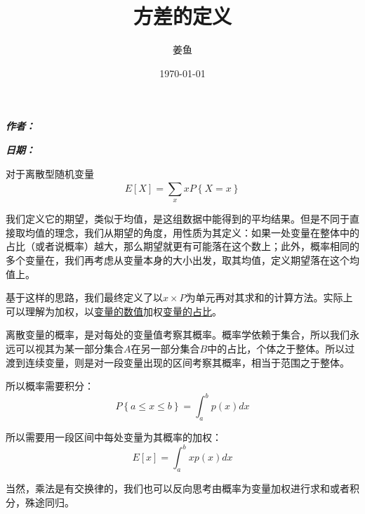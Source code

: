 \documentclass[fontset=none]{ctexart}
\makeatletter
\renewcommand{\maketitle}{
  \begin{flushleft} %
    {\huge\bfseries \@title \par} %
    \vspace{0.5em}
    {\large \bfseries \textit{作者：} \@author \par} %
    \vspace{0.5em}
    {\large\bfseries \textit{日期：}\@date} %
  \end{flushleft}
  \thispagestyle{empty} %
  \vspace{1cm} %
}
\makeatother
\begin{document}
\title{方差的定义}
\author{姜鱼}
\date{\today}
\maketitle
\songti

对于离散型随机变量$$E\left[ X \right] =\sum_x^{}{xP\left\{ X=x \right\}}$$

我们定义它的期望，类似于均值，是这组数据中能得到的平均结果。但是不同于直接取均值的理念，我们从期望的角度，用性质为其定义：如果一处变量在整体中的占比（或者说概率）越大，那么期望就更有可能落在这个数上；此外，概率相同的多个变量在，我们再考虑从变量本身的大小出发，取其均值，定义期望落在这个均值上。

基于这样的思路，我们最终定义了以$x × P$为单元再对其求和的计算方法。实际上可以理解为加权，以\underline{变量的数值}加权\underline{变量的占比}。

离散变量的概率，是对每处的变量值考察其概率。概率学依赖于集合，所以我们永远可以视其为某一部分集合$A$在另一部分集合$B$中的占比，个体之于整体。所以过渡到连续变量，则是对一段变量出现的区间考察其概率，相当于范围之于整体。

所以概率需要积分：$$P\left\{ a\leqslant x\leqslant b \right\} =\int_a^b{p\left( x \right) dx}$$

所以需要用一段区间中每处变量为其概率的加权：$$E\left[ x \right] =\int_a^b{xp\left( x \right) dx}$$

当然，乘法是有交换律的，我们也可以反向思考由概率为变量加权进行求和或者积分，殊途同归。
\end{document}
